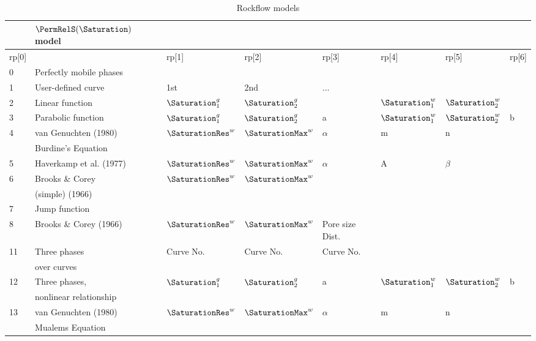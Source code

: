 \footnotesize
\begin{table}[htb!]
\caption{Rockflow models} \label{tab:} \vspace{-3mm}
\begin{center}
\begin{tabular}{|ll|llllll|}
\hline
      & $\PermRelS(\Saturation)$ model & & & & & &\\
\hline
rp[0] &                     & rp[1] & rp[2] & rp[3] & rp[4] & rp[5] & rp[6]\\
\hline
0 & Perfectly mobile phases &  &  &  &  &  & \\
\hline
1 & User-defined curve      & 1st & 2nd & ... & & & \\
\hline
2 & Linear function         & $\Saturation^g_1$ & $\Saturation^g_2$ &  & $\Saturation^w_1$ & $\Saturation^w_2$ & \\
\hline
3 & Parabolic function      & $\Saturation^g_1$ & $\Saturation^g_2$ & a & $\Saturation^w_1$ & $\Saturation^w_2$ & b \\
\hline
4 & van Genuchten (1980)    & $\SaturationRes^w$ & $\SaturationMax^w$ & $\alpha$ & m & n & \\
&Burdine's Equation&&&&&&\\
\hline
5 & Haverkamp et al. (1977) & $\SaturationRes^w$ & $\SaturationMax^w$ & $\alpha$ & A & $\beta$ & \\
\hline
6 & Brooks \& Corey   & $\SaturationRes^w$ & $\SaturationMax^w$ &  &  &  & \\
 & (simple) (1966)  & & &  &  &  & \\
\hline
7 & Jump function  & & &  &  &  & \\
\hline
8 & Brooks \& Corey (1966)  & $\SaturationRes^w$ & $\SaturationMax^w$ & Pore size Dist.&  &  & \\
\hline
11 & Three phases & Curve No. & Curve No. & Curve No.  &  &  & \\
 & over curves & & & &  &  & \\
\hline
12 & Three phases, & $\Saturation^g_1$ & $\Saturation^g_2$ & a & $\Saturation^w_1$ & $\Saturation^w_2$ & b \\
& nonlinear relationship & &&& &&\\
\hline
13 & van Genuchten (1980)&   $\SaturationRes^w$ & $\SaturationMax^w$ & $\alpha$ & m & n & \\
&Mualems Equation&&&&&&\\
 \hline
\end{tabular}
\end{center}
\end{table}
%
\normalsize

